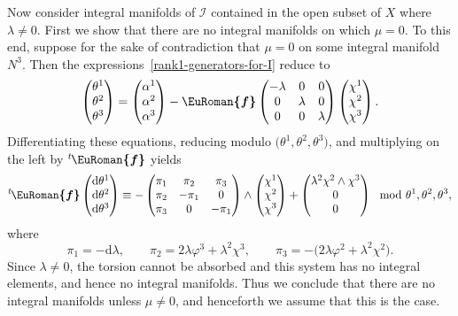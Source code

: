 \documentclass[pdftex]{sigma}
\numberwithin{equation}{section}
\newcommand{\eurom}{\EuRoman}
\renewcommand{\d}{\mathrm{d}}%
\newcommand{\cI}{{\mathcal I}}
\newcommand{\eurof}{\bm{\eurom{f}}}
\begin{document}
Now consider integral manifolds of $\cI$ contained in the open subset of $X$ where $\lambda \neq 0$. First we show that there are no integral manifolds on which $\mu=0$. To this end, suppose for the sake of contradiction that $\mu=0$ on some integral manifold $N^3$. Then the expressions~\eqref{rank1-generators-for-I} reduce to
\[
\begin{pmatrix} \theta^1 \\ \theta^2 \\ \theta^3 \end{pmatrix} = \begin{pmatrix} \alpha^1 \\ \alpha^2 \\ \alpha^3 \end{pmatrix} - \eurof \begin{pmatrix} -\lambda & 0 & 0 \\ 0 & \lambda & 0 \\ 0 & 0 & \lambda \end{pmatrix}
\begin{pmatrix} \chi^1 \\ \chi^2 \\ \chi^3 \end{pmatrix}.
\]
Differentiating these equations, reducing modulo $\big(\theta^1, \theta^2, \theta^3\big)$, and multiplying on the left by ${}^t\hskip-1pt \eurof$ yields
\[
 {}^t\hskip-1pt \eurof \begin{pmatrix} \d\theta^1 \\ \d\theta^2 \\ \d\theta^3 \end{pmatrix} \equiv
-\begin{pmatrix} \pi_1 & \pi_2 & \pi_3 \\ \pi_2 & -\pi_1 & 0 \\ \pi_3 & 0 & -\pi_1 \end{pmatrix} \wedge \begin{pmatrix} \chi^1 \\ \chi^2 \\ \chi^3 \end{pmatrix} + \begin{pmatrix} \lambda^2 \chi^2 \wedge \chi^3 \\ 0 \\ 0 \end{pmatrix}
\mod{\theta^1, \theta^2, \theta^3},
\]
where
\[ \pi_1 = -\d\lambda, \qquad \pi_2 = 2\lambda \varphi^3 + \lambda^2 \chi^3, \qquad \pi_3 = -\big(2\lambda \varphi^2 + \lambda^2 \chi^2\big). \]
Since $\lambda \neq 0$, the torsion cannot be absorbed and this system has no integral elements, and hence no integral manifolds. Thus we conclude that there are no integral manifolds unless $\mu \neq 0$, and henceforth we assume that this is the case.
\end{document}
